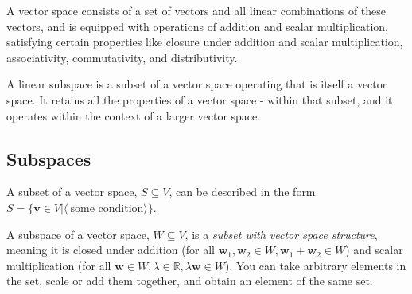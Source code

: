 \begin{paracol}{2}

A vector space consists of a set of vectors and all linear combinations of these vectors, and is equipped with operations of addition and scalar multiplication, satisfying certain properties like closure under addition and scalar multiplication, associativity, commutativity, and distributivity.

A linear subspace is a subset of a vector space operating that is itself a vector space. It retains all the properties of a vector space - within that subset, and it operates within the context of a larger vector space.

\end{paracol}

\subsection{Subspaces}

A subset of a vector space, $S \subseteq V$, can be described in the form $S = \{ \mathbf{v} \in V | \langle\ \text{some condition} \rangle \}$.

A subspace of a vector space, $W \subseteq V$, is a \textit{subset with vector space structure}, meaning it is closed under addition (for all $\mathbf{w}_1, \mathbf{w}_2 \in W, \mathbf{w}_1 + \mathbf{w}_2 \in W$) and scalar multiplication (for all $\mathbf{w} \in W, \lambda \in \mathbb{R}, \lambda \mathbf{w} \in W$). You can take arbitrary elements in the set, scale or add them together, and obtain an element of the same set.

